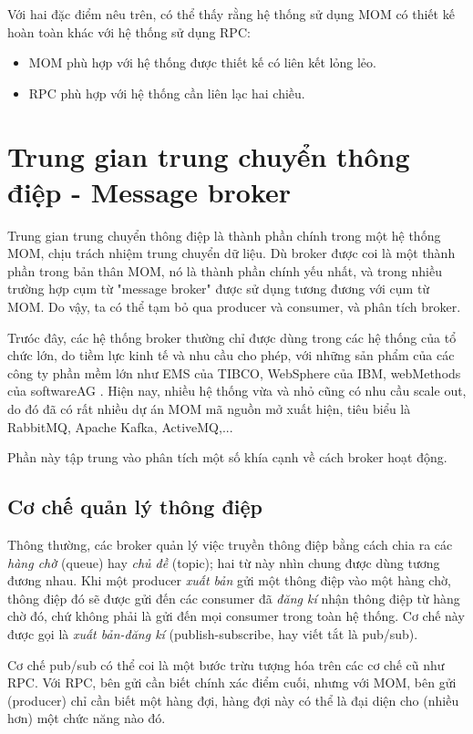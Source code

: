 \documentclass{article}
\begin{document}
Với hai đặc điểm nêu trên, có thể thấy rằng hệ thống sử dụng MOM có thiết kế hoàn
toàn khác với hệ thống sử dụng RPC:

\begin{itemize}
    \item MOM phù hợp với hệ thống được thiết kế có liên kết lỏng lẻo.
    \item RPC phù hợp với hệ thống cần liên lạc hai chiều.
\end{itemize}

\section{Trung gian trung chuyển thông điệp - Message broker}

Trung gian trung chuyển thông điệp là thành phần chính trong một hệ thống MOM,
chịu trách nhiệm trung chuyển dữ liệu. Dù broker được coi là một thành phần
trong bản thân MOM, nó là thành phần chính yếu nhất, và trong nhiều trường hợp
cụm từ "message broker" được sử dụng tương đương với cụm từ MOM. Do vậy, ta có
thể tạm bỏ qua producer và consumer, và phân tích broker.

Trưóc đây, các hệ thống broker thường chỉ được dùng trong các hệ thống của tổ
chức lớn, do tiềm lực kinh tế và nhu cầu cho phép, với những sản phẩm của các
công ty phần mềm lớn như EMS của TIBCO, WebSphere của IBM, webMethods của
softwareAG \cite{Kleppmann17C}. Hiện nay, nhiều hệ thống vừa và nhỏ cũng có nhu
cầu scale out, do đó đã có rất nhiều dự án MOM mã nguồn mở xuất hiện, tiêu biểu
là RabbitMQ, Apache Kafka, ActiveMQ,...

Phần này tập trung vào phân tích một số khía cạnh về cách broker hoạt động.

\subsection{Cơ chế quản lý thông điệp}

Thông thường, các broker quản lý việc truyền thông điệp bằng cách chia ra các
\emph{hàng chờ} (queue) hay \emph{chủ đề} (topic); hai từ này nhìn chung được
dùng tương đương nhau. Khi một producer \emph{xuất bản} gửi một thông điệp vào
một hàng chờ, thông điệp đó sẽ được gửi đến các consumer đã \emph{đăng kí} nhận
thông điệp từ hàng chờ đó, chứ không phải là gửi đến mọi consumer trong toàn hệ
thống. Cơ chế này được gọi là \emph{xuất bản-đăng kí} (publish-subscribe, hay
viết tắt là pub/sub).

Cơ chế pub/sub có thể coi là một bước trừu tượng hóa trên các cơ chế cũ như RPC.
Với RPC, bên gửi cần biết chính xác điểm cuối, nhưng với MOM, bên gửi (producer)
chỉ cần biết một hàng đợi, hàng đợi này có thể là đại diện cho (nhiều hơn) một
chức năng nào đó.
\end{document}
